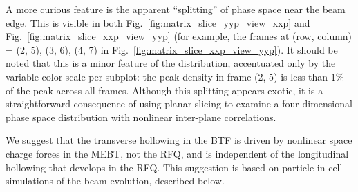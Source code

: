 \documentclass[%
 reprint,
 amsmath,amssymb,
 aps,
prstab,
]{revtex4-2}
\begin{document}
A more curious feature is the apparent ``splitting'' of phase space near the beam edge. This is visible in both Fig.~\ref{fig:matrix_slice_yyp_view_xxp} and Fig.~\ref{fig:matrix_slice_xxp_view_yyp} (for example, the frames at (row, column) = (2, 5), (3, 6), (4, 7) in Fig.~\ref{fig:matrix_slice_xxp_view_yyp}). It should be noted that this is a minor feature of the distribution, accentuated only by the variable color scale per subplot: the peak density in frame (2, 5) is less than $1\%$ of the peak across all frames. Although this splitting appears exotic, it is a straightforward consequence of using planar slicing to examine a four-dimensional phase space distribution with nonlinear inter-plane correlations.

We suggest that the transverse hollowing in the BTF is driven by nonlinear space charge forces in the MEBT, not the RFQ, and is independent of the longitudinal hollowing that develops in the RFQ. This suggestion is based on particle-in-cell simulations of the beam evolution, described below.
\end{document}
